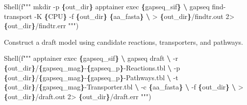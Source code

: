 \documentclass[
]{book}
\newenvironment{Shaded}{\begin{snugshade}}{\end{snugshade}}
\newcommand{\NormalTok}[1]{#1}
\newcommand{\OperatorTok}[1]{\textcolor[rgb]{0.81,0.36,0.00}{\textbf{#1}}}
\newcommand{\SpecialCharTok}[1]{\textcolor[rgb]{0.81,0.36,0.00}{\textbf{#1}}}
\newcommand{\SpecialStringTok}[1]{\textcolor[rgb]{0.31,0.60,0.02}{#1}}
\begin{document}
\begin{Shaded}
\begin{Highlighting}[numbers=left,,]
\NormalTok{Shell(}\SpecialStringTok{f"""}
\SpecialStringTok{mkdir {-}p }\SpecialCharTok{\{}\NormalTok{out\_dir}\SpecialCharTok{\}}
\SpecialStringTok{apptainer exec }\SpecialCharTok{\{}\NormalTok{gapseq\_sif}\SpecialCharTok{\}}\SpecialStringTok{ }\OperatorTok{\textbackslash{}}
\SpecialStringTok{    gapseq find{-}transport {-}K }\SpecialCharTok{\{}\NormalTok{CPU}\SpecialCharTok{\}}\SpecialStringTok{ {-}f }\SpecialCharTok{\{}\NormalTok{out\_dir}\SpecialCharTok{\}}\SpecialStringTok{ }\SpecialCharTok{\{}\NormalTok{aa\_fasta}\SpecialCharTok{\}}\SpecialStringTok{ }\OperatorTok{\textbackslash{}}
\SpecialStringTok{        \textgreater{} }\SpecialCharTok{\{}\NormalTok{out\_dir}\SpecialCharTok{\}}\SpecialStringTok{/findtr.out 2\textgreater{} }\SpecialCharTok{\{}\NormalTok{out\_dir}\SpecialCharTok{\}}\SpecialStringTok{/findtr.err}
\SpecialStringTok{"""}\NormalTok{)}
\end{Highlighting}
\end{Shaded}

Construct a draft model using candidate reactions, transporters, and pathways.

\begin{Shaded}
\begin{Highlighting}[numbers=left,,]
\NormalTok{Shell(}\SpecialStringTok{f"""}
\SpecialStringTok{apptainer exec }\SpecialCharTok{\{}\NormalTok{gapseq\_sif}\SpecialCharTok{\}}\SpecialStringTok{ }\OperatorTok{\textbackslash{}}
\SpecialStringTok{    gapseq draft }\OperatorTok{\textbackslash{}}
\SpecialStringTok{        {-}r }\SpecialCharTok{\{}\NormalTok{out\_dir}\SpecialCharTok{\}}\SpecialStringTok{/}\SpecialCharTok{\{}\NormalTok{gapseq\_mag}\SpecialCharTok{\}}\SpecialStringTok{{-}}\SpecialCharTok{\{}\NormalTok{gapseq\_p}\SpecialCharTok{\}}\SpecialStringTok{{-}Reactions.tbl }\OperatorTok{\textbackslash{}}
\SpecialStringTok{        {-}p }\SpecialCharTok{\{}\NormalTok{out\_dir}\SpecialCharTok{\}}\SpecialStringTok{/}\SpecialCharTok{\{}\NormalTok{gapseq\_mag}\SpecialCharTok{\}}\SpecialStringTok{{-}}\SpecialCharTok{\{}\NormalTok{gapseq\_p}\SpecialCharTok{\}}\SpecialStringTok{{-}Pathways.tbl }\OperatorTok{\textbackslash{}}
\SpecialStringTok{        {-}t }\SpecialCharTok{\{}\NormalTok{out\_dir}\SpecialCharTok{\}}\SpecialStringTok{/}\SpecialCharTok{\{}\NormalTok{gapseq\_mag}\SpecialCharTok{\}}\SpecialStringTok{{-}Transporter.tbl }\OperatorTok{\textbackslash{}}
\SpecialStringTok{        {-}c }\SpecialCharTok{\{}\NormalTok{aa\_fasta}\SpecialCharTok{\}}\SpecialStringTok{ }\OperatorTok{\textbackslash{}}
\SpecialStringTok{        {-}f }\SpecialCharTok{\{}\NormalTok{out\_dir}\SpecialCharTok{\}}\SpecialStringTok{ }\OperatorTok{\textbackslash{}}
\SpecialStringTok{        \textgreater{} }\SpecialCharTok{\{}\NormalTok{out\_dir}\SpecialCharTok{\}}\SpecialStringTok{/draft.out 2\textgreater{} }\SpecialCharTok{\{}\NormalTok{out\_dir}\SpecialCharTok{\}}\SpecialStringTok{/draft.err}
\SpecialStringTok{"""}\NormalTok{)}
\end{Highlighting}
\end{Shaded}
\end{document}

